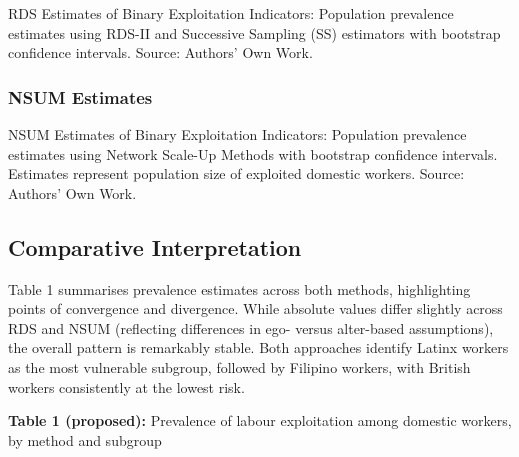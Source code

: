 \documentclass[
  12pt,
  letterpaper,
  DIV=11,
  numbers=noendperiod]{scrartcl}
\theoremstyle{plain}
\theoremstyle{definition}
\begin{document}
\begin{table}

\caption{\label{tbl-rds-binary-indicators}RDS Estimates of Binary
Exploitation Indicators: Population prevalence estimates using RDS-II
and Successive Sampling (SS) estimators with bootstrap confidence
intervals. Source: Authors' Own Work.}


\end{table}%

\subsubsection{NSUM Estimates}\label{nsum-estimates}

\begin{table}

\caption{\label{tbl-nsum-binary-indicators}NSUM Estimates of Binary
Exploitation Indicators: Population prevalence estimates using Network
Scale-Up Methods with bootstrap confidence intervals. Estimates
represent population size of exploited domestic workers. Source:
Authors' Own Work.}


\end{table}%

\subsection{Comparative
Interpretation}\label{comparative-interpretation}

Table 1 summarises prevalence estimates across both methods,
highlighting points of convergence and divergence. While absolute values
differ slightly across RDS and NSUM (reflecting differences in ego-
versus alter-based assumptions), the overall pattern is remarkably
stable. Both approaches identify Latinx workers as the most vulnerable
subgroup, followed by Filipino workers, with British workers
consistently at the lowest risk.

\textbf{Table 1 (proposed):} Prevalence of labour exploitation among
domestic workers, by method and subgroup
\end{document}
